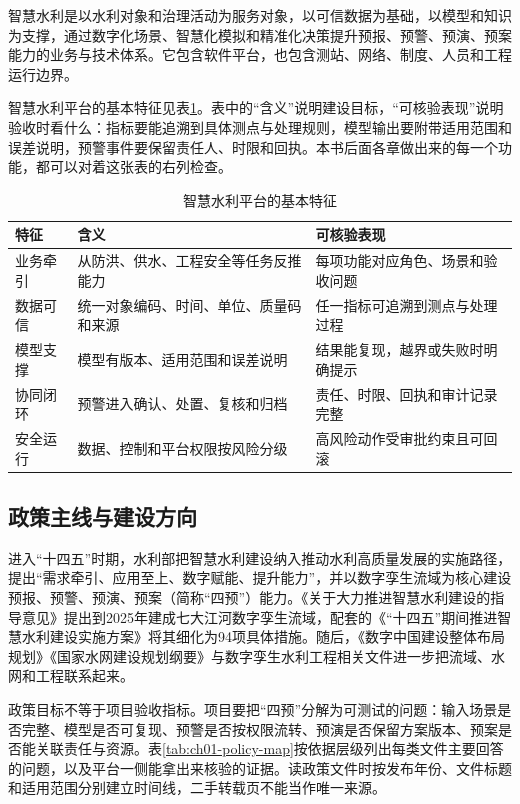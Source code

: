 智慧水利是以水利对象和治理活动为服务对象，以可信数据为基础，以模型和知识为支撑，通过数字化场景、智慧化模拟和精准化决策提升预报、预警、预演、预案能力的业务与技术体系。它包含软件平台，也包含测站、网络、制度、人员和工程运行边界。

智慧水利平台的基本特征见表\ref{tab:smart-water-features}。表中的“含义”说明建设目标，“可核验表现”说明验收时看什么：指标要能追溯到具体测点与处理规则，模型输出要附带适用范围和误差说明，预警事件要保留责任人、时限和回执。本书后面各章做出来的每一个功能，都可以对着这张表的右列检查。

\begin{table}[htbp]
\centering
\caption{智慧水利平台的基本特征}
\label{tab:smart-water-features}
\begin{tabular}{p{2.4cm}p{5.0cm}p{5.2cm}}
\toprule
特征 & 含义 & 可核验表现 \\
\midrule
业务牵引 & 从防洪、供水、工程安全等任务反推能力 & 每项功能对应角色、场景和验收问题 \\
数据可信 & 统一对象编码、时间、单位、质量码和来源 & 任一指标可追溯到测点与处理过程 \\
模型支撑 & 模型有版本、适用范围和误差说明 & 结果能复现，越界或失败时明确提示 \\
协同闭环 & 预警进入确认、处置、复核和归档 & 责任、时限、回执和审计记录完整 \\
安全运行 & 数据、控制和平台权限按风险分级 & 高风险动作受审批约束且可回滚 \\
\bottomrule
\end{tabular}
\end{table}

\subsection{政策主线与建设方向}

进入“十四五”时期，水利部把智慧水利建设纳入推动水利高质量发展的实施路径，提出“需求牵引、应用至上、数字赋能、提升能力”，并以数字孪生流域为核心建设预报、预警、预演、预案（简称“四预”）能力\cite{smartWaterGuidance2021}。《关于大力推进智慧水利建设的指导意见》提出到2025年建成七大江河数字孪生流域，配套的《“十四五”期间推进智慧水利建设实施方案》将其细化为94项具体措施\cite{smartWaterGuidance2021}。随后，《数字中国建设整体布局规划》《国家水网建设规划纲要》与数字孪生水利工程相关文件进一步把流域、水网和工程联系起来\cite{digitalChina2023,nationalWaterNetwork2023,twinProject2024}。

政策目标不等于项目验收指标。项目要把“四预”分解为可测试的问题：输入场景是否完整、模型是否可复现、预警是否按权限流转、预演是否保留方案版本、预案是否能关联责任与资源。表\ref{tab:ch01-policy-map}按依据层级列出每类文件主要回答的问题，以及平台一侧能拿出来核验的证据。读政策文件时按发布年份、文件标题和适用范围分别建立时间线，二手转载页不能当作唯一来源。

